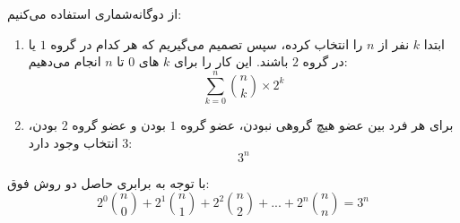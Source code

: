 \p
از دوگانه‌شماری استفاده می‌کنیم:
    \begin{enumerate}
        \item 
        ابتدا
$k$
         نفر از
$n$
          را انتخاب کرده، سپس تصمیم می‌گیریم که هر کدام در گروه 
$1$
         یا در گروه
$2$ 
    باشند. این کار را برای
$k$
          های 
$0$ 
          تا
$n$ 
         انجام می‌دهیم:
        $$\sum_{k=0}^{n} {\binom{n}{k}\times2^k}$$
        \item
       برای هر فرد بین عضو هیچ گروهی نبودن، عضو گروه 
$1$ 
        بودن و عضو گروه 
$2$ 
        بودن،
$3$ 
        انتخاب وجود دارد:
        $$3^n$$
    \end{enumerate}
با توجه به برابری حاصل دو روش فوق:
 $$2^0\binom{n}{0}+2^1\binom{n}{1}+2^2\binom{n}{2}+...+2^n\binom{n}{n}= 3^n$$